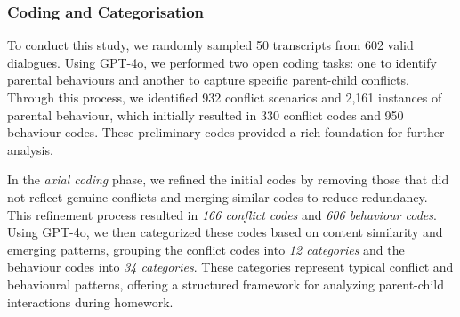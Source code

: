 \subsubsection{Coding and Categorisation}


To conduct this study, we randomly sampled 50 transcripts from 602 valid dialogues. Using GPT-4o, we performed two open coding tasks: one to identify parental behaviours and another to capture specific parent-child conflicts. Through this process, we identified 932 conflict scenarios and 2,161 instances of parental behaviour, which initially resulted in 330 conflict codes and 950 behaviour codes. These preliminary codes provided a rich foundation for further analysis.

In the \textit{axial coding} phase, we refined the initial codes by removing those that did not reflect genuine conflicts and merging similar codes to reduce redundancy. This refinement process resulted in \textit{166 conflict codes} and \textit{606 behaviour codes}. Using GPT-4o, we then categorized these codes based on content similarity and emerging patterns, grouping the conflict codes into \textit{12 categories} and the behaviour codes into \textit{34 categories}. These categories represent typical conflict and behavioural patterns, offering a structured framework for analyzing parent-child interactions during homework.


